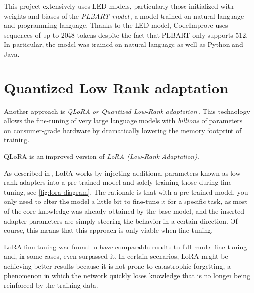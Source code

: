         \medskip

        This project extensively uses LED models, particularly those initialized with weights and biases of the \emph{PLBART model}\,\cite{ahmad2021unified}, a model trained on natural language and programming language. Thanks to the LED model, CodeImprove uses sequences of up to 2048 tokens despite the fact that PLBART only supports 512. In particular, the model was trained on natural language as well as Python and Java.

    \section{Quantized Low Rank adaptation} \label{qlora}
        Another approach is \emph{QLoRA or Quantized Low-Rank adaptation}\,\cite{dettmers2023qlora}. This technology allows the fine-tuning of very large language models with \emph{billions} of parameters on consumer-grade hardware by dramatically lowering the memory footprint of training.

        \medskip
        
        QLoRA is an improved version of \emph{LoRA (Low-Rank Adaptation)}. 
        
        As described in\,\cite{hu2021lora}, LoRA works by injecting additional parameters known as low-rank adapters into a pre-trained model and solely training those during fine-tuning, see \ref{fig:lora-diagram}. The rationale is that with a pre-trained model, you only need to alter the model a little bit to fine-tune it for a specific task, as most of the core knowledge was already obtained by the base model, and the inserted adapter parameters are simply steering the behavior in a certain direction. Of course, this means that this approach is only viable when fine-tuning.

        LoRA fine-tuning was found to have comparable results to full model fine-tuning and, in some cases, even surpassed it. In certain scenarios, LoRA might be achieving better results because it is not prone to catastrophic forgetting, a phenomenon in which the network quickly loses knowledge that is no longer being reinforced by the training data.

